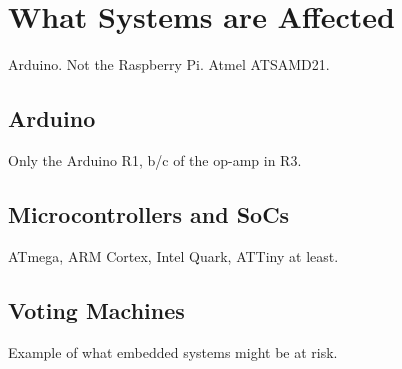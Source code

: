 \documentclass[a4paper,notitlepage]{article}
\begin{document}
\section{What Systems are Affected}
Arduino. Not the Raspberry Pi. Atmel ATSAMD21.
\subsection{Arduino}
Only the Arduino R1, b/c of the op-amp in R3.
\subsection{Microcontrollers and SoCs}
ATmega, ARM Cortex, Intel Quark, ATTiny at least.
\subsection{Voting Machines}
Example of what embedded systems might be at risk.


\appendix
\end{document}

